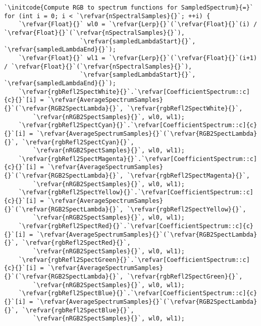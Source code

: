 \begin{lstlisting}
`\initcode{Compute RGB to spectrum functions for SampledSpectrum}{=}`
for (int i = 0; i < `\refvar{nSpectralSamples}{}`; ++i) {
    `\refvar{Float}{}` wl0 = `\refvar{Lerp}{}`(`\refvar{Float}{}`(i) / `\refvar{Float}{}`(`\refvar{nSpectralSamples}{}`),
                     `\refvar{sampledLambdaStart}{}`, `\refvar{sampledLambdaEnd}{}`);
    `\refvar{Float}{}` wl1 = `\refvar{Lerp}{}`(`\refvar{Float}{}`(i+1) / `\refvar{Float}{}`(`\refvar{nSpectralSamples}{}`),
                     `\refvar{sampledLambdaStart}{}`, `\refvar{sampledLambdaEnd}{}`);
    `\refvar{rgbRefl2SpectWhite}{}`.`\refvar[CoefficientSpectrum::c]{c}{}`[i] = `\refvar{AverageSpectrumSamples}{}`(`\refvar{RGB2SpectLambda}{}`, `\refvar{rgbRefl2SpectWhite}{}`,
        `\refvar{nRGB2SpectSamples}{}`, wl0, wl1);
    `\refvar{rgbRefl2SpectCyan}{}`.`\refvar[CoefficientSpectrum::c]{c}{}`[i] = `\refvar{AverageSpectrumSamples}{}`(`\refvar{RGB2SpectLambda}{}`, `\refvar{rgbRefl2SpectCyan}{}`,
        `\refvar{nRGB2SpectSamples}{}`, wl0, wl1);
    `\refvar{rgbRefl2SpectMagenta}{}`.`\refvar[CoefficientSpectrum::c]{c}{}`[i] = `\refvar{AverageSpectrumSamples}{}`(`\refvar{RGB2SpectLambda}{}`, `\refvar{rgbRefl2SpectMagenta}{}`,
        `\refvar{nRGB2SpectSamples}{}`, wl0, wl1);
    `\refvar{rgbRefl2SpectYellow}{}`.`\refvar[CoefficientSpectrum::c]{c}{}`[i] = `\refvar{AverageSpectrumSamples}{}`(`\refvar{RGB2SpectLambda}{}`, `\refvar{rgbRefl2SpectYellow}{}`,
        `\refvar{nRGB2SpectSamples}{}`, wl0, wl1);
    `\refvar{rgbRefl2SpectRed}{}`.`\refvar[CoefficientSpectrum::c]{c}{}`[i] = `\refvar{AverageSpectrumSamples}{}`(`\refvar{RGB2SpectLambda}{}`, `\refvar{rgbRefl2SpectRed}{}`,
        `\refvar{nRGB2SpectSamples}{}`, wl0, wl1);
    `\refvar{rgbRefl2SpectGreen}{}`.`\refvar[CoefficientSpectrum::c]{c}{}`[i] = `\refvar{AverageSpectrumSamples}{}`(`\refvar{RGB2SpectLambda}{}`, `\refvar{rgbRefl2SpectGreen}{}`,
        `\refvar{nRGB2SpectSamples}{}`, wl0, wl1);
    `\refvar{rgbRefl2SpectBlue}{}`.`\refvar[CoefficientSpectrum::c]{c}{}`[i] = `\refvar{AverageSpectrumSamples}{}`(`\refvar{RGB2SpectLambda}{}`, `\refvar{rgbRefl2SpectBlue}{}`,
        `\refvar{nRGB2SpectSamples}{}`, wl0, wl1);


\end{lstlisting}
